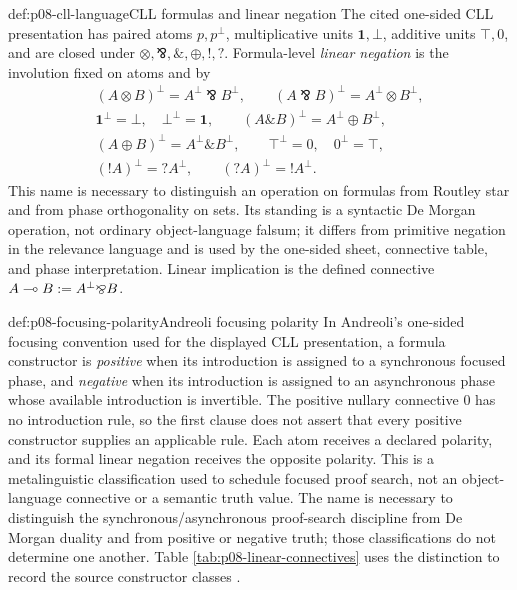 \begin{hbdefinition}{def:p08-cll-language}{CLL formulas and linear negation}
The cited one-sided CLL presentation has paired atoms
\(p,p^\perp\), multiplicative units \(\mathbf 1,\bot\), additive units
\(\top,0\), and are closed under
\(\otimes,\bindnasrepma,\mathbin{\&},\oplus,!,?\).  Formula-level
\emph{linear negation} is the involution fixed on atoms and by
\[
\begin{gathered}
 (A\otimes B)^\perp=A^\perp\bindnasrepma B^\perp,
 \qquad
 (A\bindnasrepma B)^\perp=A^\perp\otimes B^\perp,\\
 \mathbf 1^\perp=\bot,\quad \bot^\perp=\mathbf 1,\qquad
 (A\mathbin{\&}B)^\perp=A^\perp\oplus B^\perp,\\
 (A\oplus B)^\perp=A^\perp\mathbin{\&}B^\perp,
 \qquad \top^\perp=0,\quad 0^\perp=\top,\\
 (!A)^\perp=?A^\perp,\qquad(?A)^\perp=!A^\perp.
\end{gathered}
\]
This name is necessary to distinguish an operation on formulas from Routley
star and from phase orthogonality on sets.  Its standing is a syntactic De
Morgan operation, not ordinary object-language falsum; it differs from
primitive negation in the relevance language and is used by the one-sided
sheet, connective table, and phase interpretation.  Linear implication is the
defined connective \(A\multimap B\mathrel{:=} A^\perp\bindnasrepma B\).
\end{hbdefinition}

\begin{hbdefinition}{def:p08-focusing-polarity}{Andreoli focusing polarity}
In Andreoli's one-sided focusing convention used for the displayed CLL
presentation, a formula constructor is
\emph{positive} when its introduction is assigned to a synchronous focused
phase, and \emph{negative} when its introduction is assigned to an
asynchronous phase whose available introduction is invertible.  The positive
nullary connective \(0\) has no introduction rule, so the first clause does
not assert that every positive constructor supplies an applicable rule.  Each
atom receives a declared polarity, and its formal linear negation receives the
opposite polarity.  This is a metalinguistic classification used to schedule
focused proof search, not an object-language connective or a semantic truth
value.  The name is necessary to distinguish the synchronous/asynchronous
proof-search discipline from De Morgan duality and from positive or negative
truth; those classifications do not determine one another.  Table
\ref{tab:p08-linear-connectives} uses the distinction to record the source
constructor classes \cite{Andreoli1992}.
\end{hbdefinition}

